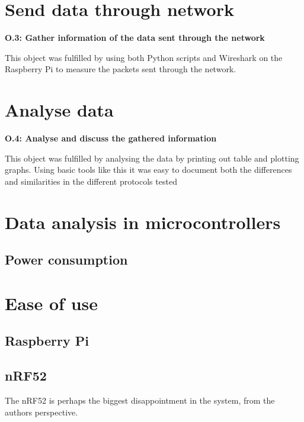 \section{Send data through network}

\noindent\textbf{O.3: Gather information of the data sent through the network}

This object was fulfilled by using both Python scripts and Wireshark on the Raspberry Pi to measure the packets sent through the network. 

\section{Analyse data}

\noindent\textbf{O.4: Analyse and discuss the gathered information}

This object was fulfilled by analysing the data by printing out table and plotting graphs. Using basic tools like this it was easy to document both the differences and similarities in the different protocols tested 






\section{Data analysis in microcontrollers}



\subsection{Power consumption}



\section{Ease of use}


\subsection{Raspberry Pi}



\subsection{nRF52}

The nRF52 is perhaps the biggest disappointment in the system, from the authors perspective. 


